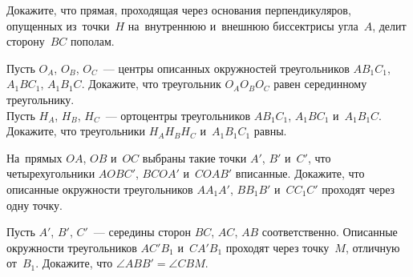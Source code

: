 \begin{problems}
\item
Докажите, что прямая, проходящая через основания перпендикуляров, опущенных
из~точки~$H$ на~внутреннюю и~внешнюю биссектрисы угла~$A$, делит сторону~$BC$
пополам.

\item
\subproblem
Пусть $O_A$, $O_B$, $O_C$~— центры описанных окружностей треугольников
$A B_1 C_1$, $A_1 B C_1$, $A_1 B_1 C$.
Докажите, что треугольник $O_A O_B O_C$ равен серединному треугольнику.
\\
\subproblem
Пусть $H_A$, $H_B$, $H_C$~— ортоцентры треугольников
$A B_1 C_1$, $A_1 B C_1$ и~$A_1 B_1 C$.
Докажите, что треугольники $H_A H_B H_C$ и~$A_1 B_1 C_1$ равны.

\item
На~прямых $OA$, $OB$ и~$OC$ выбраны такие точки $A'$, $B'$ и~$C'$, что
четырехугольники $AOBC'$, $BCOA'$ и~$COAB'$ вписанные.
Докажите, что описанные окружности треугольников
$A A_1 A'$, $B B_1 B'$ и~$C C_1 C'$ проходят через одну точку.

\item
Пусть $A'$, $B'$, $C'$~— середины сторон $BC$, $AC$, $AB$ соответственно.
Описанные окружности треугольников $A C' B_1$ и~$C A' B_1$ проходят через
точку~$M$, отличную от~$B_1$.
Докажите, что $\angle ABB' = \angle CBM$.

\end{problems}

